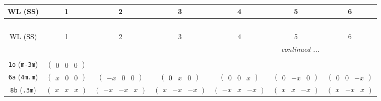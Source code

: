 \documentclass[fleqn,9pt,landscape]{jsarticle}
\begin{document}
\begin{center}
\renewcommand{\arraystretch}{1.2}
\begin{longtable}{ccccccc}
 \hline \hline
WL (SS) & 1 & 2 & 3 & 4 & 5 & 6 \\ \hline \endfirsthead

\multicolumn{6}{l}{\tablename\ \thetable{}} \\
 \hline \hline
WL (SS) & 1 & 2 & 3 & 4 & 5 & 6 \\ \hline \endhead

 \hline \hline
\multicolumn{6}{r}{\footnotesize\it continued ...} \\ \endfoot

 \hline \hline
\multicolumn{6}{r}{} \\ \endlastfoot

{\tt 1o} ({\tt m-3m}) & $ \begin{pmatrix} 0 & 0 & 0 \end{pmatrix} $ & $  $ & $  $ & $  $ & $  $ & $  $ \\ \hline
{\tt 6a} ({\tt 4m.m}) & $ \begin{pmatrix} x & 0 & 0 \end{pmatrix} $ & $ \begin{pmatrix} - x & 0 & 0 \end{pmatrix} $ & $ \begin{pmatrix} 0 & x & 0 \end{pmatrix} $ & $ \begin{pmatrix} 0 & 0 & x \end{pmatrix} $ & $ \begin{pmatrix} 0 & - x & 0 \end{pmatrix} $ & $ \begin{pmatrix} 0 & 0 & - x \end{pmatrix} $ \\ \hline
{\tt 8b} ({\tt .3m}) & $ \begin{pmatrix} x & x & x \end{pmatrix} $ & $ \begin{pmatrix} - x & - x & x \end{pmatrix} $ & $ \begin{pmatrix} x & - x & - x \end{pmatrix} $ & $ \begin{pmatrix} - x & x & - x \end{pmatrix} $ & $ \begin{pmatrix} x & x & - x \end{pmatrix} $ & $ \begin{pmatrix} x & - x & x \end{pmatrix} $ \\

\end{longtable}
\end{center}
\end{document}
